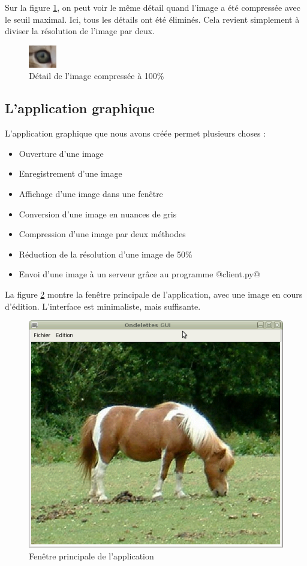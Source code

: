 \documentclass{article}
\begin{document}
Sur la figure \ref{chat3}, on peut voir le même détail quand l'image a été compressée avec le seuil maximal. Ici, tous les détails ont été éliminés. Cela revient simplement à diviser la résolution de l'image par deux.

\begin{figure}[!h]
\centering
\includegraphics[scale=2]{chat_compress255.jpg}
\caption{Détail de l'image compressée à 100\%}
\label{chat3}
\end{figure}



\subsection{L'application graphique}

L'application graphique que nous avons créée permet plusieurs choses :

\begin{itemize}
\item Ouverture d'une image
\item Enregistrement d'une image
\item Affichage d'une image dans une fenêtre
\item Conversion d'une image en nuances de gris
\item Compression d'une image par deux méthodes
\item Réduction de la résolution d'une image de 50\%
\item Envoi d'une image à un serveur grâce au programme @client.py@
\end{itemize}

La figure \ref{GUI} montre la fenêtre principale de l'application, avec une image en cours d'édition. L'interface est minimaliste, mais suffisante.


\begin{figure}[!hb]
\centering
\includegraphics[scale=0.5]{OndelettesGUI.png}
\caption{Fenêtre principale de l'application}
\label{GUI}
\end{figure}
\end{document}
